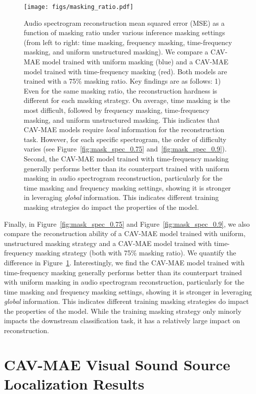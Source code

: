 \documentclass{article} \usepackage{iclr2023_conference,times}
\begin{document}
\begin{figure}[t]
\centering
\texttt{[image: figs/masking\_ratio.pdf]}
\caption{Audio spectrogram reconstruction mean squared error (MSE) as a function of masking ratio under various inference masking settings (from left to right: time masking, frequency masking, time-frequency masking, and uniform unstructured masking). We compare a CAV-MAE model trained with uniform masking (blue) and a CAV-MAE model trained with time-frequency masking (red). Both models are trained with a 75\% masking ratio. Key findings are as follows: 1) Even for the same masking ratio, the reconstruction hardness is different for each masking strategy. On average, time masking is the most difficult, followed by frequency masking, time-frequency masking, and uniform unstructured masking. This indicates that CAV-MAE models require \emph{local} information for the reconstruction task. However, for each specific spectrogram, the order of difficulty varies (see Figure~\ref{fig:mask_spec_0.75} and~\ref{fig:mask_spec_0.9}). Second, the CAV-MAE model trained with time-frequency masking generally performs better than its counterpart trained with uniform masking in audio spectrogram reconstruction, particularly for the time masking and frequency masking settings, showing it is stronger in leveraging \emph{global} information. This indicates different training masking strategies do impact the properties of the model.}
\label{fig:mask_mse}
\end{figure}

Finally, in Figure~\ref{fig:mask_spec_0.75} and Figure~\ref{fig:mask_spec_0.9}, we also compare the reconstruction ability of a CAV-MAE model trained with uniform, unstructured masking strategy and a CAV-MAE model trained with time-frequency masking strategy (both with 75\% masking ratio). We quantify the difference in Figure~\ref{fig:mask_mse}. Interestingly, we find the CAV-MAE model trained with time-frequency masking generally performs better than its counterpart trained with uniform masking in audio spectrogram reconstruction, particularly for the time masking and frequency masking settings, showing it is stronger in leveraging \emph{global} information. This indicates different training masking strategies do impact the properties of the model. While the training masking strategy only minorly impacts the downstream classification task, it has a relatively large impact on reconstruction.

\section{CAV-MAE Visual Sound Source Localization Results}
\label{sec:localization}
\end{document}
